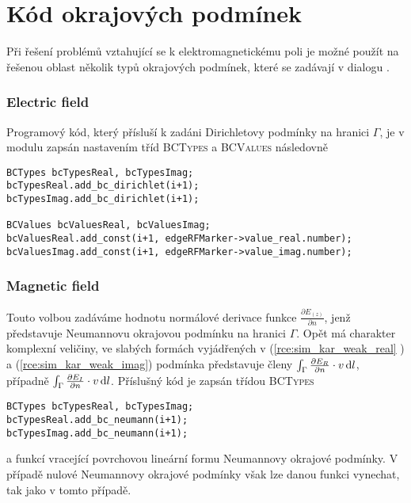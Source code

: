 \section{Kód okrajových podmínek}
Při řešení problémů vztahující se k elektromagnetickému poli je možné použít na řešenou oblast několik typů okrajových podmínek, které se zadávají v dialogu . 

\subsubsection*{Electric field}
Programový kód, který přísluší k zadáni Dirichletovy podmínky na hranici $\Gamma$, je v modulu zapsán nastavením tříd \textsc{BCTypes} a \textsc{BCValues} následovně
\begin{verbatim}
BCTypes bcTypesReal, bcTypesImag;
bcTypesReal.add_bc_dirichlet(i+1);
bcTypesImag.add_bc_dirichlet(i+1);
                
BCValues bcValuesReal, bcValuesImag;
bcValuesReal.add_const(i+1, edgeRFMarker->value_real.number);
bcValuesImag.add_const(i+1, edgeRFMarker->value_imag.number);
\end{verbatim}

\subsubsection*{Magnetic field}
Touto volbou zadáváme hodnotu normálové derivace funkce $\frac{\partial E_{(z)}}{\partial n}$, jenž představuje Neumannovu okrajovou podmínku na hranici $\Gamma$. Opět má charakter komplexní veličiny, ve slabých formách vyjádřených v (\ref{rce:sim_kar_weak_real} ) a (\ref{rce:sim_kar_weak_imag}) podmínka představuje členy $\int_{\Gamma}\frac{\partial E_R}{\partial n}\cdot v\,\mathrm{d} l$, případně $\int_{\Gamma}\frac{\partial E_I}{\partial n}\cdot v\,\mathrm{d} l$. Příslušný kód je zapsán třídou \textsc{BCTypes}
\begin{verbatim}
BCTypes bcTypesReal, bcTypesImag;
bcTypesReal.add_bc_neumann(i+1);
bcTypesImag.add_bc_neumann(i+1);               
\end{verbatim}
a funkcí vracející povrchovou lineární formu Neumannovy okrajové podmínky. V případě nulové Neumannovy okrajové podmínky však lze danou funkci vynechat, tak jako v tomto případě.

